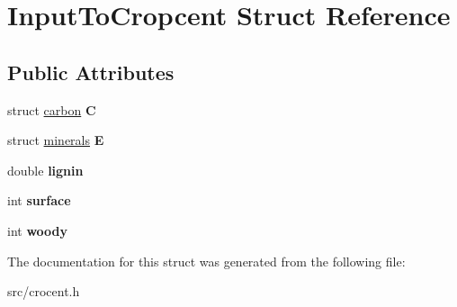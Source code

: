 \hypertarget{struct_input_to_cropcent}{\section{Input\-To\-Cropcent Struct Reference}
\label{struct_input_to_cropcent}
}
\subsection*{Public Attributes}
\begin{DoxyCompactItemize}
\item 
\hypertarget{struct_input_to_cropcent_abc48d1da559034cb63dfab0ddc418453}{struct \hyperlink{structcarbon}{carbon} {\bfseries C}}\label{struct_input_to_cropcent_abc48d1da559034cb63dfab0ddc418453}

\item 
\hypertarget{struct_input_to_cropcent_a93ed69e44e074e2d94a81b324a2a800d}{struct \hyperlink{structminerals}{minerals} {\bfseries E}}\label{struct_input_to_cropcent_a93ed69e44e074e2d94a81b324a2a800d}

\item 
\hypertarget{struct_input_to_cropcent_a392bc9b0d59dc6e4057730d3258f5e23}{double {\bfseries lignin}}\label{struct_input_to_cropcent_a392bc9b0d59dc6e4057730d3258f5e23}

\item 
\hypertarget{struct_input_to_cropcent_a19650792c799a2b4074d5d29e047e3e2}{int {\bfseries surface}}\label{struct_input_to_cropcent_a19650792c799a2b4074d5d29e047e3e2}

\item 
\hypertarget{struct_input_to_cropcent_a5878550dde0644868d841b07a47d5dfd}{int {\bfseries woody}}\label{struct_input_to_cropcent_a5878550dde0644868d841b07a47d5dfd}

\end{DoxyCompactItemize}


The documentation for this struct was generated from the following file\-:\begin{DoxyCompactItemize}
\item 
src/crocent.\-h\end{DoxyCompactItemize}
